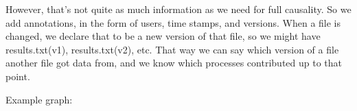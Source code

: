 \documentclass{article}
\begin{document}
\begin{figure}[h!]
\end{figure}



%




However, that's not quite as much information as we need for full causality. So we add annotations, in the form of users, time stamps, and versions. When a file is changed, we declare that to be a new version of that file, so we might have results.txt(v1), results.txt(v2), etc. That way we can say which version of a file another file got data from, and we know which processes contributed up to that point.

Example graph:
\end{document}
